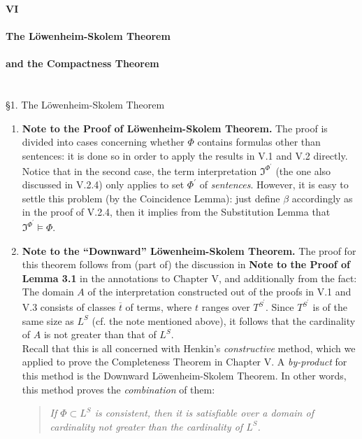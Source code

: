 {\LARGE \bfseries VI \\ \\ The L\"{o}wenheim-Skolem Theorem\\ \\and the Compactness Theorem}
\\
\\
\\
{\large \S1. The L\"{o}wenheim-Skolem Theorem}
\begin{enumerate}[1.]
\item \textbf{Note to the Proof of L\"{o}wenheim-Skolem Theorem.} The proof is divided into cases concerning whether $\Phi$ contains formulas other than sentences: it is done so in order to apply the results in V.1 and V.2 directly.\newline
\\
Notice that in the second case, the term interpretation $\mathfrak{I}^{\Phi^\prime}$ (the one also discussed in V.2.4) only applies to set $\Phi^\prime$ of \textit{sentences}. However, it is easy to settle this problem (by the Coincidence Lemma): just define $\beta$ accordingly as in the proof of V.2.4, then it implies from the Substitution Lemma that $\mathfrak{I}^{\Phi^\prime} \models \Phi$.
%
\item \textbf{Note to the ``Downward'' L\"{o}wenheim-Skolem Theorem.} The proof for this theorem follows from (part of) the discussion in \textbf{Note to the Proof of Lemma 3.1} in the annotations to Chapter V, and additionally from the fact: The domain $A$ of the interpretation constructed out of the proofs in V.1 and V.3 consists of classes $\overline{t}$ of terms, where $t$ ranges over $T^{S^\prime}$. Since $T^{S^\prime}$ is of the same size as $L^S$ (cf. the note mentioned above), it follows that the cardinality of $A$ is not greater than that of $L^S$.\newline
\ 
\\Recall that this is all concerned with Henkin's \emph{constructive} method, which we applied to prove the Completeness Theorem in Chapter V. A \emph{by-product} for this method is the Downward L\"{o}wenheim-Skolem Theorem. In other words, this method proves the \emph{combination} of them:
\begin{quote}
\emph{If $\Phi \subset L^S$ is consistent, then it is satisfiable over a domain of cardinality not greater than the cardinality of $L^S$.}

\end{quote}
\end{enumerate}
